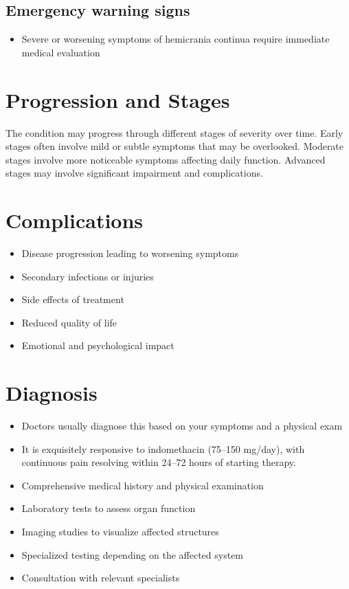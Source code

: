 \subsection{Emergency warning signs}
\begin{itemize}[noitemsep]
  \item Severe or worsening symptoms of hemicrania continua require immediate medical evaluation
\end{itemize}
\section{Progression and Stages}
The condition may progress through different stages of severity over time. Early stages often involve mild or subtle symptoms that may be overlooked. Moderate stages involve more noticeable symptoms affecting daily function. Advanced stages may involve significant impairment and complications.
\section{Complications}
\begin{itemize}[noitemsep]
  \item Disease progression leading to worsening symptoms
  \item Secondary infections or injuries
  \item Side effects of treatment
  \item Reduced quality of life
  \item Emotional and psychological impact
\end{itemize}
\section{Diagnosis}
\begin{itemize}[noitemsep]
  \item Doctors usually diagnose this based on your symptoms and a physical exam
  \item It is exquisitely responsive to indomethacin (75--150 mg/day), with continuous pain resolving within 24--72 hours of starting therapy.
  \item Comprehensive medical history and physical examination
  \item Laboratory tests to assess organ function
  \item Imaging studies to visualize affected structures
  \item Specialized testing depending on the affected system
  \item Consultation with relevant specialists
\end{itemize}
